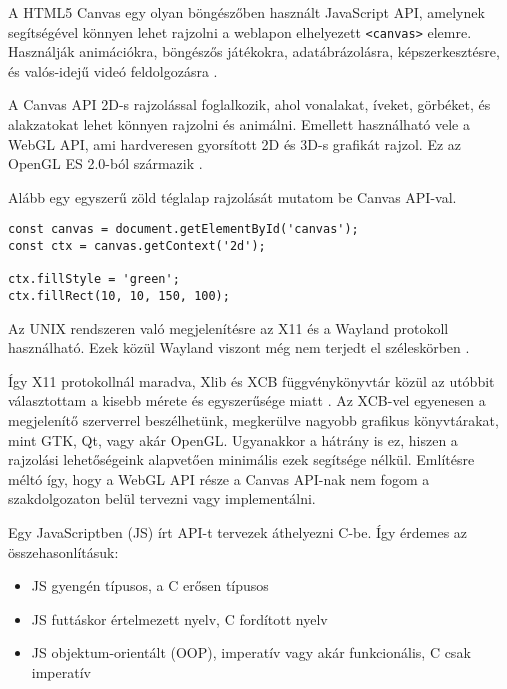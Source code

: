 

A HTML5 Canvas egy olyan böngészőben használt JavaScript API, amelynek segítségével könnyen lehet rajzolni a weblapon elhelyezett \texttt{<canvas>} elemre. Használják animációkra, böngészős játékokra, adatábrázolásra, képszerkesztésre, és valós-idejű videó feldolgozásra \cite{canvasapi}.

A Canvas API 2D-s rajzolással foglalkozik, ahol vonalakat, íveket, görbéket, és alakzatokat lehet könnyen rajzolni és animálni.
Emellett használható vele a WebGL API, ami hardveresen gyorsított 2D és 3D-s grafikát rajzol. Ez az OpenGL ES 2.0-ból származik \cite{webgl}.

Alább egy egyszerű zöld téglalap rajzolását mutatom be Canvas API-val.

\begin{verbatim}
const canvas = document.getElementById('canvas');
const ctx = canvas.getContext('2d');

ctx.fillStyle = 'green';
ctx.fillRect(10, 10, 150, 100);
\end{verbatim}


Az UNIX rendszeren való megjelenítésre az X11 és a Wayland protokoll használható. Ezek közül Wayland viszont még nem terjedt el széleskörben \cite{waylandsupport}.

Így X11 protokollnál maradva, Xlib és XCB függvénykönyvtár közül az utóbbit választottam a kisebb mérete és egyszerűsége miatt \cite{xcb}.
Az XCB-vel egyenesen a megjelenítő szerverrel beszélhetünk, megkerülve nagyobb grafikus könyvtárakat, mint GTK, Qt, vagy akár OpenGL. Ugyanakkor a hátrány is ez, hiszen a rajzolási lehetőségeink alapvetően minimális ezek segítsége nélkül. Említésre méltó így, hogy a WebGL API része a Canvas API-nak nem fogom a szakdolgozaton belül tervezni vagy implementálni.


Egy JavaScriptben (JS) írt API-t tervezek áthelyezni C-be. Így érdemes az összehasonlításuk:
\begin{itemize}
    \item JS gyengén típusos, a C erősen típusos
    \item JS futtáskor értelmezett nyelv, C fordított nyelv
    \item JS objektum-orientált (OOP), imperatív vagy akár funkcionális, C csak imperatív
\end{itemize}

